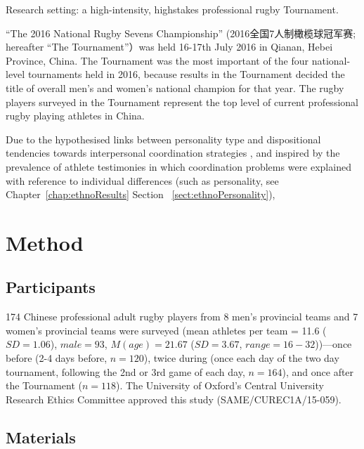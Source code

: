 \begin{CJK}{UTF8}{gbsn}
Research setting: a high-intensity, highstakes professional rugby Tournament.

``The 2016 National Rugby Sevens Championship'' (2016全国7人制橄榄球冠军赛; hereafter ``The Tournament''）was held 16-17th July 2016 in Qianan, Hebei Province, China. The Tournament was the most important of the four national-level tournaments held in 2016, because results in the Tournament decided the title of overall men's and women’s national champion for that year. The rugby players surveyed in the Tournament represent the top level of current professional rugby playing athletes in China.



Due to the hypothesised links between personality type and dispositional tendencies towards interpersonal coordination strategies \citep[e.g.][]{Richards2007,Marsh2009,Sevdalis2014}, and inspired by the prevalence of athlete testimonies in which coordination problems were explained with reference to individual differences (such as personality, see Chapter~\ref{chap:ethnoResults} Section ~\ref{sect:ethnoPersonality}),


\clearpage

\section{Method}
\subsection{Participants}
174 Chinese professional adult rugby players from 8 men’s provincial teams and 7 women’s provincial teams were surveyed  (mean athletes per team = 11.6 ($SD =1.06$), $male = 93$, $M(age) = 21.67$ ($SD = 3.67$, $range = 16 - 32$))---once before (2-4 days before, $n = 120$), twice during (once each day of the two day tournament, following the 2nd or 3rd game of each day, $n = 164$), and once after the Tournament ($n = 118$).  The University of Oxford’s Central University Research Ethics Committee approved this study (SAME/CUREC1A/15-059).

\subsection{Materials}


\end{CJK}
